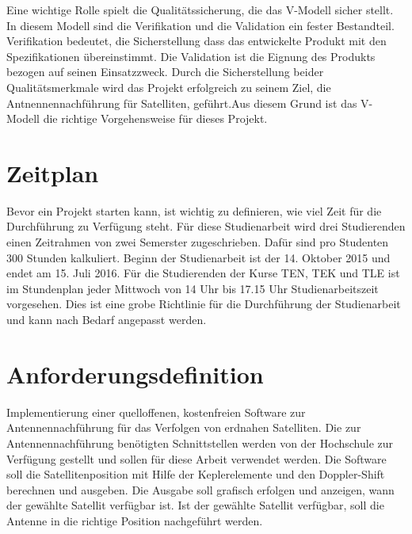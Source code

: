Eine wichtige Rolle spielt die Qualitätssicherung, die das V-Modell sicher stellt. In diesem Modell sind die Verifikation und die Validation ein 
fester Bestandteil. Verifikation bedeutet, die Sicherstellung dass das entwickelte Produkt mit den Spezifikationen übereinstimmt.
Die Validation ist die Eignung des Produkts bezogen auf seinen Einsatzzweck. Durch die Sicherstellung beider Qualitätsmerkmale wird das Projekt 
erfolgreich zu seinem Ziel, die Antnennennachführung für Satelliten, geführt.Aus diesem Grund ist 
das V-Modell die richtige Vorgehensweise für 
dieses Projekt.
\newpar

\section{Zeitplan}
Bevor ein Projekt starten kann, ist wichtig  zu definieren, wie viel Zeit für die Durchführung zu Verfügung steht. Für diese Studienarbeit 
wird drei Studierenden einen Zeitrahmen von zwei Semerster zugeschrieben. Dafür sind pro Studenten 300 Stunden kalkuliert. Beginn der Studienarbeit 
ist der 14. Oktober 2015 und endet am 15. Juli 2016. Für die Studierenden der Kurse TEN, TEK und TLE 
ist im Stundenplan jeder Mittwoch von 14 Uhr bis 
17.15 Uhr Studienarbeitszeit vorgesehen. Dies ist eine grobe Richtlinie für die Durchführung der Studienarbeit und kann nach Bedarf angepasst werden.
\newpar

\section{Anforderungsdefinition}
Implementierung einer quelloffenen, kostenfreien Software zur Antennennachführung für das Verfolgen 
von erdnahen Satelliten. Die zur Antennennachführung
benötigten Schnittstellen werden von der Hochschule zur Verfügung gestellt und sollen für diese Arbeit verwendet werden. Die Software soll die 
Satellitenposition mit Hilfe der Keplerelemente und den Doppler-Shift berechnen und ausgeben. Die Ausgabe soll grafisch erfolgen und anzeigen, wann
der gewählte Satellit verfügbar ist. Ist der gewählte Satellit verfügbar, soll die Antenne in die richtige Position nachgeführt werden. 
\newpar

